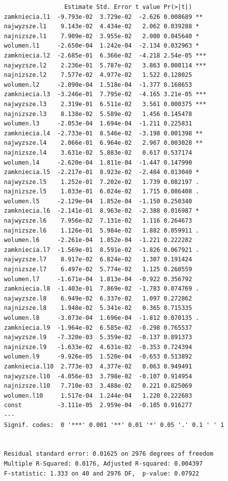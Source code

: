 \documentclass[
  polish,
  letterpaper,
  DIV=11,
  numbers=noendperiod]{scrartcl}
\begin{document}
\begin{verbatim}
                 Estimate Std. Error t value Pr(>|t|)    
zamkniecia.l1  -9.793e-02  3.729e-02  -2.626 0.008689 ** 
najwyzsze.l1    9.143e-02  4.434e-02   2.062 0.039288 *  
najnizsze.l1    7.909e-02  3.955e-02   2.000 0.045640 *  
wolumen.l1     -2.650e-04  1.242e-04  -2.134 0.032963 *  
zamkniecia.l2  -2.685e-01  6.366e-02  -4.218 2.54e-05 ***
najwyzsze.l2    2.236e-01  5.787e-02   3.863 0.000114 ***
najnizsze.l2    7.577e-02  4.977e-02   1.522 0.128025    
wolumen.l2     -2.090e-04  1.518e-04  -1.377 0.168653    
zamkniecia.l3  -3.246e-01  7.795e-02  -4.165 3.21e-05 ***
najwyzsze.l3    2.319e-01  6.511e-02   3.561 0.000375 ***
najnizsze.l3    8.138e-02  5.589e-02   1.456 0.145478    
wolumen.l3     -2.053e-04  1.694e-04  -1.211 0.225831    
zamkniecia.l4  -2.733e-01  8.546e-02  -3.198 0.001398 ** 
najwyzsze.l4    2.066e-01  6.964e-02   2.967 0.003028 ** 
najnizsze.l4    3.631e-02  5.883e-02   0.617 0.537174    
wolumen.l4     -2.620e-04  1.811e-04  -1.447 0.147990    
zamkniecia.l5  -2.217e-01  8.923e-02  -2.484 0.013040 *  
najwyzsze.l5    1.252e-01  7.202e-02   1.739 0.082197 .  
najnizsze.l5    1.033e-01  6.024e-02   1.715 0.086408 .  
wolumen.l5     -2.129e-04  1.852e-04  -1.150 0.250340    
zamkniecia.l6  -2.141e-01  8.963e-02  -2.388 0.016987 *  
najwyzsze.l6    7.956e-02  7.131e-02   1.116 0.264673    
najnizsze.l6    1.126e-01  5.984e-02   1.882 0.059911 .  
wolumen.l6     -2.261e-04  1.852e-04  -1.221 0.222282    
zamkniecia.l7  -1.569e-01  8.591e-02  -1.826 0.067921 .  
najwyzsze.l7    8.917e-02  6.824e-02   1.307 0.191424    
najnizsze.l7    6.497e-02  5.774e-02   1.125 0.260559    
wolumen.l7     -1.671e-04  1.813e-04  -0.922 0.356792    
zamkniecia.l8  -1.403e-01  7.869e-02  -1.783 0.074769 .  
najwyzsze.l8    6.949e-02  6.337e-02   1.097 0.272862    
najnizsze.l8    1.948e-02  5.341e-02   0.365 0.715335    
wolumen.l8     -3.073e-04  1.696e-04  -1.812 0.070135 .  
zamkniecia.l9  -1.964e-02  6.585e-02  -0.298 0.765537    
najwyzsze.l9   -7.320e-03  5.359e-02  -0.137 0.891373    
najnizsze.l9   -1.633e-02  4.631e-02  -0.353 0.724394    
wolumen.l9     -9.926e-05  1.520e-04  -0.653 0.513892    
zamkniecia.l10  2.773e-03  4.377e-02   0.063 0.949491    
najwyzsze.l10  -4.056e-03  3.798e-02  -0.107 0.914954    
najnizsze.l10   7.710e-03  3.488e-02   0.221 0.825069    
wolumen.l10     1.517e-04  1.244e-04   1.220 0.222603    
const          -3.111e-05  2.959e-04  -0.105 0.916277    
---
Signif. codes:  0 '***' 0.001 '**' 0.01 '*' 0.05 '.' 0.1 ' ' 1


Residual standard error: 0.01625 on 2976 degrees of freedom
Multiple R-Squared: 0.0176, Adjusted R-squared: 0.004397 
F-statistic: 1.333 on 40 and 2976 DF,  p-value: 0.07922 



\end{verbatim}
\end{document}
